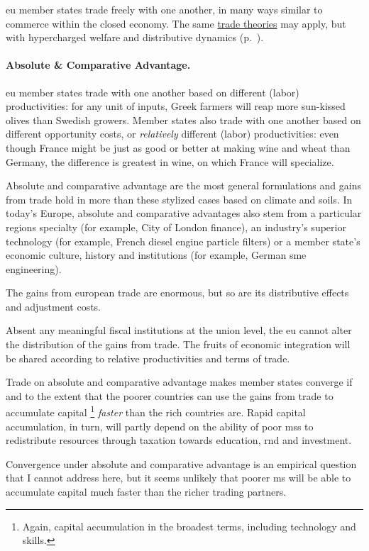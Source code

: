 \gls{eu} member states trade freely with one another, in many ways similar to commerce within the closed economy.
The same \hyperref[sec:space]{trade theories} may apply, but with hypercharged welfare and distributive dynamics (p.~\pageref{sec:space}).

\paragraph{Absolute \& Comparative Advantage.}
\gls{eu} member states trade with one another based on different (labor) productivities:
for any unit of inputs, Greek farmers will reap more sun-kissed olives than Swedish growers.
Member states also trade with one another based on different opportunity costs, or \emph{relatively} different (labor) productivities:
even though France might be just as good or better at making wine and wheat than Germany, the difference is greatest in wine, on which France will specialize.

Absolute and comparative advantage are the most general formulations and gains from trade hold in more than these stylized cases based on climate and soils.
In today's Europe, absolute and comparative advantages also stem from a particular regions specialty (for example, City of London finance), an industry's superior technology (for example, French diesel engine particle filters) or a member state's economic culture, history and institutions (for example, German \gls{sme} engineering).

The gains from european trade are enormous, but so are its distributive effects and adjustment costs.

Absent any meaningful fiscal institutions at the union level, the \gls{eu} cannot alter the distribution of the gains from trade.
The fruits of economic integration will be shared according to relative productivities and terms of trade.

Trade on absolute and comparative advantage makes member states converge if and to the extent that the poorer countries can use the gains from trade to accumulate capital
\footnote{
	Again, capital accumulation in the broadest terms, including technology and skills.
}
\emph{faster} than the rich countries are.
Rapid capital accumulation, in turn, will partly depend on the ability of poor \glspl{ms} to redistribute resources through taxation towards education, \gls{rnd} and investment.

Convergence under absolute and comparative advantage is an empirical question that I cannot address here, but it seems unlikely that poorer \gls{ms} will be able to accumulate capital much faster than the richer trading partners.

